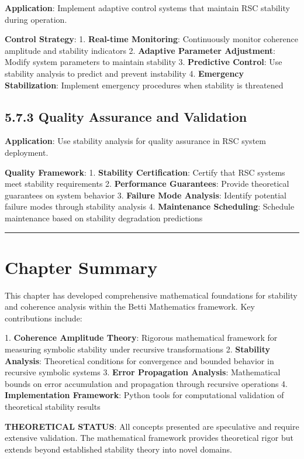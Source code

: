 \textbf{Application}: Implement adaptive control systems that maintain RSC stability during operation.

\textbf{Control Strategy}:
1. \textbf{Real-time Monitoring}: Continuously monitor coherence amplitude and stability indicators
2. \textbf{Adaptive Parameter Adjustment}: Modify system parameters to maintain stability
3. \textbf{Predictive Control}: Use stability analysis to predict and prevent instability
4. \textbf{Emergency Stabilization}: Implement emergency procedures when stability is threatened

\subsection{5.7.3 Quality Assurance and Validation}

\textbf{Application}: Use stability analysis for quality assurance in RSC system deployment.

\textbf{Quality Framework}:
1. \textbf{Stability Certification}: Certify that RSC systems meet stability requirements
2. \textbf{Performance Guarantees}: Provide theoretical guarantees on system behavior
3. \textbf{Failure Mode Analysis}: Identify potential failure modes through stability analysis
4. \textbf{Maintenance Scheduling}: Schedule maintenance based on stability degradation predictions

\hrule

\section{Chapter Summary}

This chapter has developed comprehensive mathematical foundations for stability and coherence analysis within the Betti Mathematics framework. Key contributions include:

1. \textbf{Coherence Amplitude Theory}: Rigorous mathematical framework for measuring symbolic stability under recursive transformations
2. \textbf{Stability Analysis}: Theoretical conditions for convergence and bounded behavior in recursive symbolic systems
3. \textbf{Error Propagation Analysis}: Mathematical bounds on error accumulation and propagation through recursive operations
4. \textbf{Implementation Framework}: Python tools for computational validation of theoretical stability results

\textbf{THEORETICAL STATUS}: All concepts presented are speculative and require extensive validation. The mathematical framework provides theoretical rigor but extends beyond established stability theory into novel domains.

